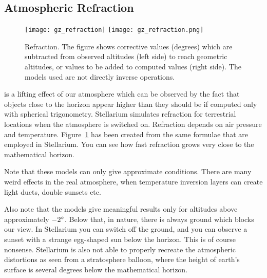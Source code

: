 \subsection{Atmospheric Refraction}
\label{sec:phenomena:Refraction}


\begin{figure}%
\centering
\ifpdf
\texttt{[image: gz\_refraction]}
\else
\texttt{[image: gz\_refraction.png]}
\fi
\caption{Refraction. The figure shows corrective values (degrees)
  which are subtracted from observed altitudes (left side) to reach
  geometric altitudes, or values to be added to computed values (right
  side). The models used are not directly inverse operations.}
\label{fig:Refraction}
\end{figure}


 is a lifting effect of our
atmosphere which can be observed by the fact that objects close to the
horizon appear higher than they should be if computed only with
spherical trigonometry. Stellarium simulates refraction for
terrestrial locations when the atmosphere is switched on. Refraction
depends on air pressure and temperature. Figure~\ref{fig:Refraction}
has been created from the same formulae that are employed in
Stellarium. You can see how fast refraction grows very close to the
mathematical horizon.

Note that these models can only give approximate conditions. There are
many weird effects in the real atmosphere, when temperature inversion
layers can create light ducts, double sunsets etc.

Also note that the models give meaningful results only for altitudes
above approximately $-2\degree$. Below that, in nature, there is
always ground which blocks our view. In Stellarium you can switch off
the ground, and you can observe a sunset with a strange egg-shaped sun
below the horizon. This is of course nonsense. Stellarium is also not
able to properly recreate the atmospheric distortions as seen from a
stratosphere balloon, where the height of earth's surface is several
degrees below the mathematical horizon.

